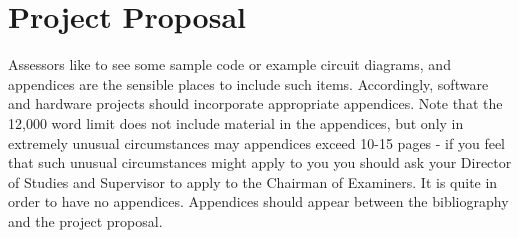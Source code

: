 \documentclass[12pt,a4paper,twoside,openright]{report}
\begin{document}
\appendix

\chapter{Project Proposal}
\label{sec:proposal}
Assessors like to see some sample code or example circuit diagrams, and appendices are the sensible places to include such items. Accordingly, software and hardware projects should incorporate appropriate appendices. Note that the 12,000 word limit does not include material in the appendices, but only in extremely unusual circumstances may appendices exceed 10-15 pages - if you feel that such unusual circumstances might apply to you you should ask your Director of Studies and Supervisor to apply to the Chairman of Examiners. It is quite in order to have no appendices. Appendices should appear between the bibliography and the project proposal.

\end{document}
